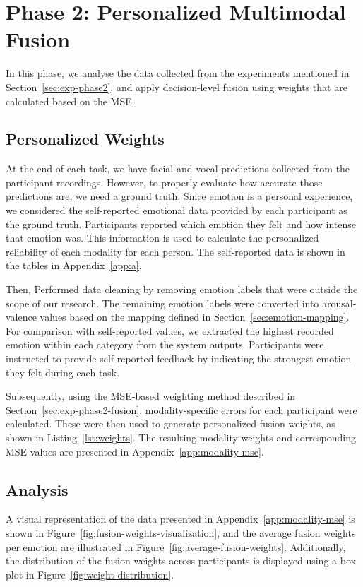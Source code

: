 \section{Phase 2: Personalized Multimodal Fusion}

In this phase, we analyse the data collected from the experiments mentioned in Section~\ref{sec:exp-phase2}, and apply decision-level fusion using weights that are calculated based on the MSE.

\subsection{Personalized Weights}

At the end of each task, we have facial and vocal predictions collected from the participant recordings. However, to properly evaluate how accurate those predictions are, we need a ground truth. Since emotion is a personal experience, we considered the self-reported emotional data provided by each participant as the ground truth. Participants reported which emotion they felt and how intense that emotion was. This information is used to calculate the personalized reliability of each modality for each person. The self-reported data is shown in the tables in Appendix~\ref{app:a}.

Then, Performed data cleaning by removing emotion labels that were outside the scope of our research. The remaining emotion labels were converted into arousal-valence values based on the mapping defined in Section~\ref{sec:emotion-mapping}. For comparison with self-reported values, we extracted the highest recorded emotion within each category from the system outputs. Participants were instructed to provide self-reported feedback by indicating the strongest emotion they felt during each task.

Subsequently, using the MSE-based weighting method described in Section~\ref{sec:exp-phase2-fusion}, modality-specific errors for each participant were calculated. These were then used to generate personalized fusion weights, as shown in Listing~\ref{lst:weights}. The resulting modality weights and corresponding MSE values are presented in Appendix~\ref{app:modality-mse}.

 


\subsection*{Analysis}  

A visual representation of the data presented in Appendix~\ref{app:modality-mse} is shown in Figure~\ref{fig:fusion-weights-visualization}, and the average fusion weights per emotion are illustrated in Figure~\ref{fig:average-fusion-weights}. Additionally, the distribution of the fusion weights across participants is displayed using a box plot in Figure~\ref{fig:weight-distribution}.

